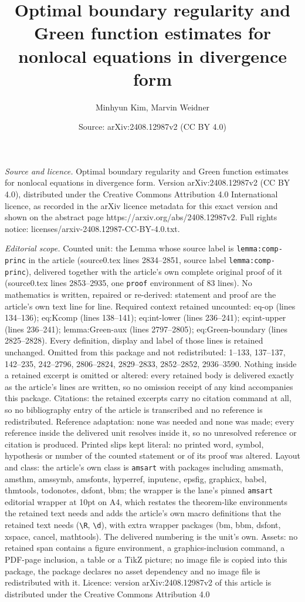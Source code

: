 \documentclass[10pt,a4paper]{amsart}
\title[Optimal boundary regularity and Green function estimates for]{Optimal boundary regularity and Green function estimates for nonlocal equations in divergence form}
\author{Minhyun Kim, Marvin Weidner}
\date{Source: arXiv:2408.12987v2 (CC BY 4.0)}
\begin{document}
\maketitle

\noindent\emph{Source and licence.} Optimal boundary regularity and Green function estimates for nonlocal equations in divergence form. Version arXiv:2408.12987v2 (CC BY 4.0), distributed under the Creative Commons Attribution 4.0 International licence, as recorded in the arXiv licence metadata for this exact version and shown on the abstract page https://arxiv.org/abs/2408.12987v2. Full rights notice: licenses/arxiv-2408.12987-CC-BY-4.0.txt.\par\smallskip

\noindent\textit{Editorial scope.} Counted unit: the Lemma whose source label is \texttt{lemma:comp-princ} in the article (source0.tex lines 2834--2851, source label \texttt{lemma:comp-princ}), delivered together with the article's own complete original proof of it (source0.tex lines 2853--2935, one \texttt{proof} environment of 83 lines). No mathematics is written, repaired or re-derived: statement and proof are the article's own text line for line. Required context retained uncounted: eq-op (lines 134--136); eq:Kcomp (lines 138--141); eq:int-lower (lines 236--241); eq:int-upper (lines 236--241); lemma:Green-aux (lines 2797--2805); eq:Green-boundary (lines 2825--2828). Every definition, display and label of those lines is retained unchanged. Omitted from this package and not redistributed: 1--133, 137--137, 142--235, 242--2796, 2806--2824, 2829--2833, 2852--2852, 2936--3590. Nothing inside a retained excerpt is omitted or altered: every retained body is delivered exactly as the article's lines are written, so no omission receipt of any kind accompanies this package. Citations: the retained excerpts carry no citation command at all, so no bibliography entry of the article is transcribed and no reference is redistributed. Reference adaptation: none was needed and none was made; every reference inside the delivered unit resolves inside it, so no unresolved reference or citation is produced. Printed slips kept literal: no printed word, symbol, hypothesis or number of the counted statement or of its proof was altered. Layout and class: the article's own class is \texttt{amsart} with packages including amsmath, amsthm, amssymb, amsfonts, hyperref, inputenc, epsfig, graphicx, babel, thmtools, todonotes, dsfont, bbm; the wrapper is the lane's pinned \texttt{amsart} editorial wrapper at 10pt on A4, which restates the theorem-like environments the retained text needs and adds the article's own macro definitions that the retained text needs (\texttt{\textbackslash R}, \texttt{\textbackslash d}), with extra wrapper packages (bm, bbm, dsfont, xspace, cancel, mathtools). The delivered numbering is the unit's own. Assets: no retained span contains a figure environment, a graphics-inclusion command, a PDF-page inclusion, a table or a TikZ picture; no image file is copied into this package, the package declares no asset dependency and no image file is redistributed with it. Licence: version arXiv:2408.12987v2 of this article is distributed under the Creative Commons Attribution 4.0 
\end{document}
